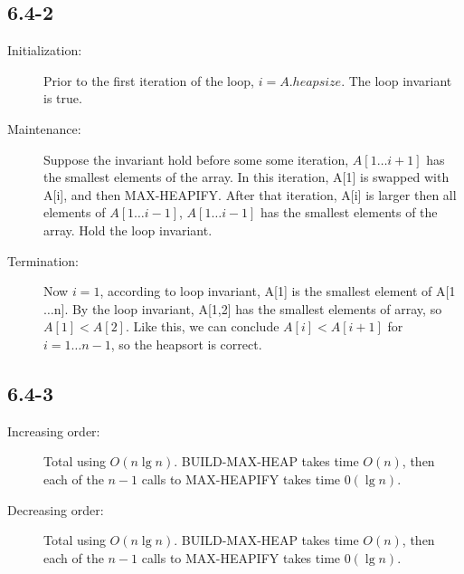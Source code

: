 \documentclass[10pt]{article}
\begin{document}
\subsection*{6.4-2}
\begin{description}
\item[Initialization:] Prior to the first iteration of the loop, $i = A.heapsize$. The loop invariant is true.
\item[Maintenance:] Suppose the invariant hold before some some iteration,
  $A[1\ldots{}i+1]$ has the smallest elements of the array. In this iteration, A[1] is swapped with A[i], and then MAX-HEAPIFY. After that iteration,  A[i] is larger then all elements of $A[1\ldots{}i-1]$, $A[1\ldots{}i-1]$ has the smallest elements of the array. Hold the loop invariant.
\item[Termination:] Now $i = 1$, according to loop invariant, A[1] is the smallest element of A[1$\ldots$n]. By the loop invariant, A[1,2] has the smallest elements of array, so $A[1] < A[2]$. Like this, we can conclude $A[i] < A[i+1]$ for $i=1\ldots{}n-1$, so the heapsort is correct.
\end{description}

\subsection*{6.4-3}
\begin{description}
\item[Increasing order:] Total using $O(n\lg n)$. BUILD-MAX-HEAP takes time $O(n)$, then each of the $n-1$ calls to MAX-HEAPIFY takes time $0(\lg n)$.
\item[Decreasing order:] Total using $O(n\lg n)$. BUILD-MAX-HEAP takes time $O(n)$, then each of the $n-1$ calls to MAX-HEAPIFY takes time $0(\lg n)$.
\end{description}
\end{document}
